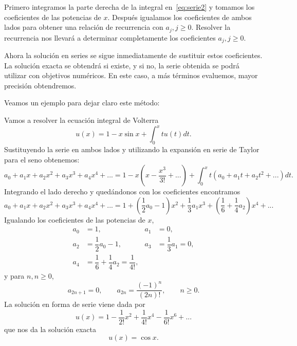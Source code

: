 Primero integramos la parte derecha de la integral en~\eqref{eq:serie2} y tomamos los coeficientes de las potencias de $x$. Después igualamos los coeficientes de ambos lados para obtener una relación de recurrencia con $a_j, j\geqslant0$. Resolver la recurrencia nos llevará a determinar completamente los coeficientes $a_j, j\geqslant0$.

Ahora la solución en series se sigue inmediatamente de sustituir estos coeficientes. La solución exacta se obtendrá si existe, y si no, la serie obtenida se podrá utilizar con objetivos numéricos. En este caso, a más términos evaluemos, mayor precisión obtendremos.

Veamos un ejemplo para dejar claro este método:
\begin{ejemplo}
	Vamos a resolver la ecuación integral de Volterra
	\begin{equation}
		u(x) = 1 - x \sin x + \int_{0}^{x} tu(t)dt.
	\end{equation}
	Sustituyendo la serie en ambos lados y utilizando la expansión en serie de Taylor para el seno obtenemos:
	\begin{equation}
		a_0 + a_1x + a_2x^2 + a_3x^3 + a_4x^4 + ... = 1 - x(x-\dfrac{x^3}{3!} + ...) + \int_{0}^{x}t(a_0+a_1t+a_2t^2+...)dt.
	\end{equation}
	Integrando el lado derecho y quedándonos con los coeficientes encontramos
	\begin{equation}
		a_0 + a_1x + a_2x^2 + a_3x^3 + a_4x^4 + ... = 1+(\dfrac{1}{2}a_0-1)x^2+\dfrac{1}{3}a_1x^3+(\dfrac{1}{6}+\dfrac{1}{4}a_2)x^4+...
	\end{equation}
	Igualando los coeficientes de las potencias de $x$,
	\begin{align}
		a_0&=1,          &  a_1&=0,      \\
		a_2&=\dfrac{1}{2}a_0-1,   &  a_3&=\dfrac{1}{3}a_1 = 0, \\
		a_4&=\dfrac{1}{6}+\dfrac{1}{4}a_2 = \dfrac{1}{4!},
	\end{align}
	y para $n, n\geqslant0$,
	\begin{equation}
		a_{2n+1} = 0, \qquad a_{2n} = \dfrac{(-1)^n}{(2n)!}, \qquad n \geqslant 0.
	\end{equation}
	La solución en forma de serie viene dada por
	\begin{equation}
		u(x) = 1 - \dfrac{1}{2!}x^2 + \dfrac{1}{4!}x^4-\dfrac{1}{6!}x^6+...
	\end{equation}
	que nos da la solución exacta
	\begin{equation}
		u(x) = \cos x.
	\end{equation}
\end{ejemplo}


